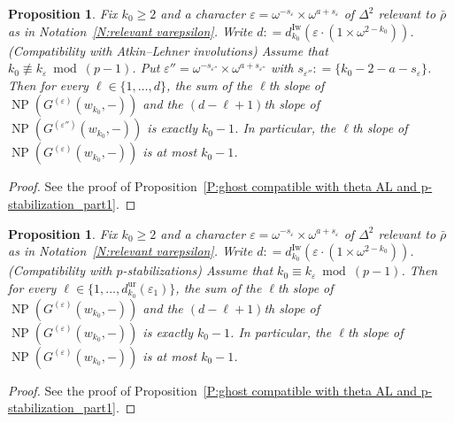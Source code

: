 \documentclass[12pt]{amsart}
\newtheorem{proposition}[subsection]{Proposition}
\theoremstyle{definition}
\numberwithin{equation}{subsection}
\DeclareMathOperator{\NP}{NP}
\newcommand{\Iw}{\mathrm{Iw}}
\newcommand{\unr}{\mathrm{ur}}
\begin{document}
\begin{proposition}
\label{P:ghost compatible with theta AL and p-stabilization_part2}
Fix $k_0 \geq 2$ and a character $\varepsilon= \omega^{-s_\varepsilon} \times \omega^{a+s_\varepsilon}$ of $\Delta^2$ relevant to $\bar \rho$ as in Notation~\ref{N:relevant varepsilon}. Write $d: = d_{k_0}^\Iw(\varepsilon\cdot (1\times \omega^{2-k_0}))$.
(Compatibility with Atkin--Lehner involutions)
Assume that ${k_0}\not \equiv k_\varepsilon \bmod{(p-1)}$.
Put $\varepsilon'' = \omega^{-s_{\varepsilon''}} \times \omega^{a+s_{\varepsilon''}}$ with $s_{\varepsilon''}: = \{{k_0}-  2-a-s_\varepsilon\}$.  Then for every $\ell \in \{1, \dots, d\}$, the sum of the $\ell$th slope of $\NP(G^{(\varepsilon)}(w_{k_0}, -))$ and the $(d-\ell+1)$th slope of $\NP(G^{(\varepsilon'')}(w_{k_0}, -))$ is exactly ${k_0}-1$.
In particular, the $\ell$th slope of $\NP(G^{(\varepsilon)}(w_{k_0}, -))$ is at most $k_0-1$.
\end{proposition}
\begin{proof}
See the proof of Proposition~\ref{P:ghost compatible with theta AL and p-stabilization_part1}.
\end{proof}

\begin{proposition}
\label{P:ghost compatible with theta AL and p-stabilization_part3}
Fix $k_0 \geq 2$ and a character $\varepsilon= \omega^{-s_\varepsilon} \times \omega^{a+s_\varepsilon}$ of $\Delta^2$ relevant to $\bar \rho$ as in Notation~\ref{N:relevant varepsilon}. Write $d: = d_{k_0}^\Iw(\varepsilon\cdot (1\times \omega^{2-k_0}))$.
(Compatibility with $p$-stabilizations)
Assume that ${k_0}\equiv k_\varepsilon \bmod {(p-1)}$. Then for every $\ell \in \{1, \dots, d_{k_0}^\unr(\varepsilon_1)\}$, the sum of the $\ell$th slope of $\NP(G^{(\varepsilon)}(w_{k_0}, -))$ and the $(d-\ell+1)$th slope of $\NP(G^{(\varepsilon)}(w_{k_0}, -))$ is exactly ${k_0}-1$.
In particular, the $\ell$th slope of $\NP(G^{(\varepsilon)}(w_{k_0}, -))$ is at most ${k_0}-1$.
\end{proposition}
\begin{proof}
See the proof of Proposition~\ref{P:ghost compatible with theta AL and p-stabilization_part1}.
\end{proof}
\end{document}
